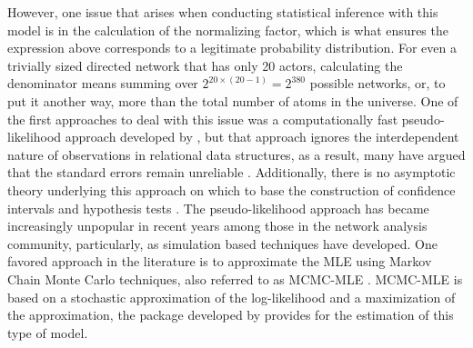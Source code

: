However, one issue that arises when conducting statistical inference with this model is in the calculation of the normalizing factor, which is what ensures the expression above corresponds to a legitimate probability distribution. For even a trivially sized directed network that has only 20 actors, calculating the denominator means summing over $2^{20\times(20-1)} = 2^{380}$ possible networks, or, to put it another way, more than the total number of atoms in the universe. One of the first approaches to deal with this issue was a computationally fast pseudo-likelihood approach developed by \citet{strauss:iked:1990}, but that approach ignores the interdependent nature of observations in relational data structures, as a result, many have argued that the standard errors remain unreliable \citep{lubbers:snijders:2007,robins:etal:2007b,vanduijn:etal:2009}. Additionally, there is no asymptotic theory underlying this approach on which to base the construction of confidence intervals and hypothesis tests \citep{kolaczyk:2009}. The pseudo-likelihood approach has became increasingly unpopular in recent years among those in the network analysis community, particularly, as simulation based techniques have developed. One favored approach in the literature is to approximate the MLE using Markov Chain Monte Carlo techniques, also referred to as MCMC-MLE \citep{geyer:thompson:1992,snijders:2002,handcock:2003b}. MCMC-MLE is based on a stochastic approximation of the log-likelihood and a maximization of the approximation, the  package developed by \citet{hunter:etal:2008} provides for the estimation of this type of model.

